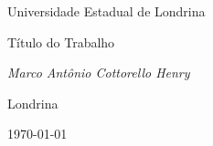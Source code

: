 \begin{titlepage}
  \centering
  \vspace*{2cm}
  {\Large Universidade Estadual de Londrina \par}
  \vspace{3cm}
  {\Huge Título do Trabalho \par}
  \vspace{2cm}
  {\Large\itshape Marco Antônio Cottorello Henry \par}
  \vfill
  {\large Londrina \par}
  {\Large \today \par}
\end{titlepage}
